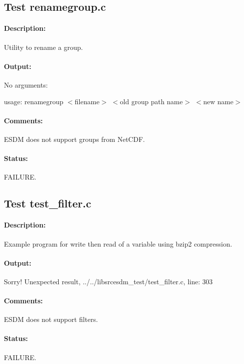 \subsection{Test renamegroup.c}

\paragraph{Description:} Utility to rename a group.

\paragraph{Output:} No arguments:

usage: renamegroup $<$filename$>$ $<$old group path name$>$ $<$new name$>$

\paragraph{Comments:} ESDM does not support groups from NetCDF.

\paragraph{Status:} FAILURE.

\subsection{Test test\_filter.c}

\paragraph{Description:} Example program for write then read of a variable using bzip2 compression.

\paragraph{Output:} Sorry! Unexpected result, ../../libsrcesdm\_test/test\_filter.c, line: 303

\paragraph{Comments:} ESDM does not support filters.

\paragraph{Status:} FAILURE.

